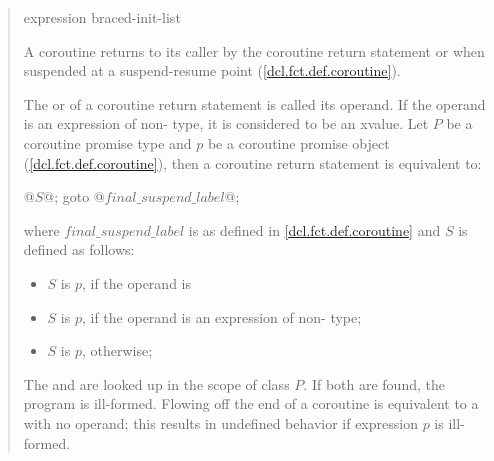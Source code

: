 \begin{quote}

\begin{bnf}
	\br
	 expression\opt \terminal{;}\br
	 braced-init-list\terminal{;}
\end{bnf}

\pnum
A coroutine returns to its caller by the coroutine return statement
or when suspended at a suspend-resume point (\ref{dcl.fct.def.coroutine}). 

\pnum
The  or  of a coroutine return statement is called its operand.
If the operand is an expression of non- type, it is considered to be an xvalue.
Let $P$ be a coroutine promise type and $p$ be a coroutine promise object (\ref{dcl.fct.def.coroutine}), then a
coroutine return statement is equivalent to:
 

\begin{codeblock}
  { @$S$@; goto @$final{\_}suspend{
      \_}label$@; }
\end{codeblock}

where $final{\_}suspend{\_}label$ is as defined in \ref{dcl.fct.def.coroutine} and $S$ is defined as follows:

\begin{itemize}
  \item $S$ is $p$\tcode{)}, if the operand is 
  \item $S$ is $p$\tcode{)}, if the operand is an expression of non- type;
  \item $S$ is $p$, otherwise;
\end{itemize}

\pnum
The 
 and  are looked up in the scope of class $P$. 
If both are found, the program is ill-formed. Flowing off the end of a coroutine is equivalent to a  with no operand; this results in
undefined behavior if expression $p$ is ill-formed.


\end{quote}

